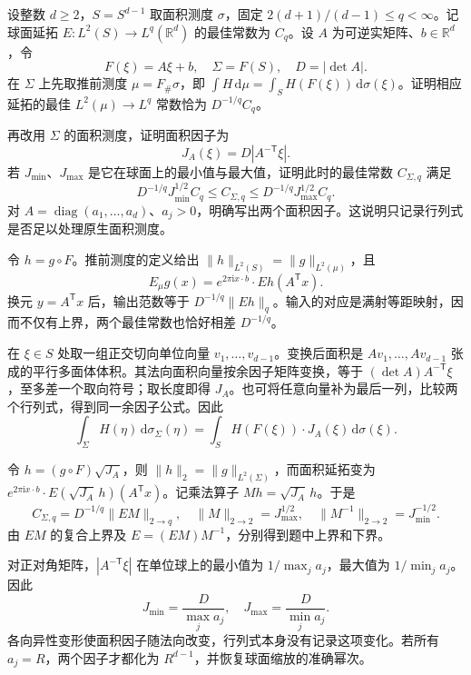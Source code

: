 \begin{exercise}\label{b2:ex:23-new-2}
设整数 \(d\geq2\)，\(S=S^{d-1}\) 取面积测度 \(\sigma\)，固定
\(2(d+1)/(d-1)\leq q<\infty\)。记球面延拓 \(E:L^2(S)\to L^q(\mathbb R^d)\) 的最佳常数为 \(C_q\)。设 \(A\) 为可逆实矩阵、\(b\in\mathbb R^d\)，令
\[
 F(\xi)=A\xi+b,\quad \Sigma=F(S),\quad D=|\det A|.
\]
在 \(\Sigma\) 上先取推前测度 \(\mu=F_\#\sigma\)，即
\(\int H\,\mathrm d\mu=\int_S H(F(\xi))\,\mathrm d\sigma(\xi)\)。证明相应延拓的最佳 \(L^2(\mu)\to L^q\) 常数恰为 \(D^{-1/q}C_q\)。

\ProseParagraphBreak

再改用 \(\Sigma\) 的面积测度，证明面积因子为
\[
 J_A(\xi)=D|A^{-\mathsf T}\xi|.
\]
若 \(J_{\min}\)、\(J_{\max}\) 是它在球面上的最小值与最大值，证明此时的最佳常数 \(C_{\Sigma,q}\) 满足
\[
 D^{-1/q}J_{\min}^{1/2}C_q
 \leq C_{\Sigma,q}
 \leq D^{-1/q}J_{\max}^{1/2}C_q.
\]
对 \(A=\operatorname{diag}(a_1,\ldots,a_d)\)、\(a_j>0\)，明确写出两个面积因子。这说明只记录行列式是否足以处理原生面积测度。
\end{exercise}
\begin{solution}
令 \(h=g\circ F\)。推前测度的定义给出 \(\|h\|_{L^2(S)}=\|g\|_{L^2(\mu)}\)，且
\[
 E_\mu g(x)=e^{2\pi\mathrm i x\cdot b}\cdot Eh(A^{\mathsf T}x).
\]
换元 \(y=A^{\mathsf T}x\) 后，输出范数等于 \(D^{-1/q}\|Eh\|_q\)。输入的对应是满射等距映射，因而不仅有上界，两个最佳常数也恰好相差 \(D^{-1/q}\)。

在 \(\xi\in S\) 处取一组正交切向单位向量 \(v_1,\ldots,v_{d-1}\)。变换后面积是 \(Av_1,\ldots,Av_{d-1}\) 张成的平行多面体体积。其法向面积向量按余因子矩阵变换，等于 \((\det A)A^{-\mathsf T}\xi\)，至多差一个取向符号；取长度即得 \(J_A\)。也可将任意向量补为最后一列，比较两个行列式，得到同一余因子公式。因此
\[
 \int_\Sigma H(\eta)\,\mathrm d\sigma_\Sigma(\eta)
 =\int_S H(F(\xi))\cdot J_A(\xi)\,\mathrm d\sigma(\xi).
\]

令 \(h=(g\circ F)\sqrt{J_A}\)，则 \(\|h\|_2=\|g\|_{L^2(\Sigma)}\)，而面积延拓变为
\(e^{2\pi\mathrm i x\cdot b}\cdot E(\sqrt{J_A}\,h)(A^{\mathsf T}x)\)。记乘法算子 \(M h=\sqrt{J_A}\,h\)。于是
\[
 C_{\Sigma,q}=D^{-1/q}\|EM\|_{2\to q},
 \quad \|M\|_{2\to2}=J_{\max}^{1/2},
 \quad \|M^{-1}\|_{2\to2}=J_{\min}^{-1/2}.
\]
由 \(EM\) 的复合上界及 \(E=(EM)M^{-1}\)，分别得到题中上界和下界。

对正对角矩阵，\(|A^{-\mathsf T}\xi|\) 在单位球上的最小值为 \(1/\max_j a_j\)，最大值为 \(1/\min_j a_j\)。因此
\[
 J_{\min}=\frac D{\max_j a_j},
 \quad J_{\max}=\frac D{\min_j a_j}.
\]
各向异性变形使面积因子随法向改变，行列式本身没有记录这项变化。若所有 \(a_j=R\)，两个因子才都化为 \(R^{d-1}\)，并恢复球面缩放的准确幂次。
\end{solution}

